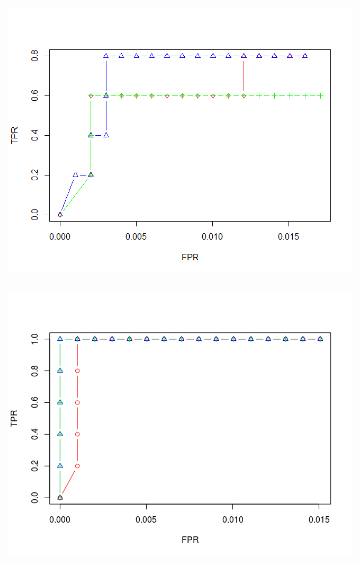\documentclass[11pt]{report}\usepackage[utf8]{inputenc}
\begin{document}
\begin{figure}[h]
\begin{subfigure}[b]{0.3\textwidth}
        \includegraphics[width=\textwidth]{../plots/AR03}
        \caption{}
    \end{subfigure}
    \begin{subfigure}[b]{0.3\textwidth}
        \includegraphics[width=\textwidth]{../plots/200AR09}
        \caption{}
    \end{subfigure}
    \begin{subfigure}[b]{0.3\textwidth}

\end{subfigure}
\end{figure}
\end{document}
